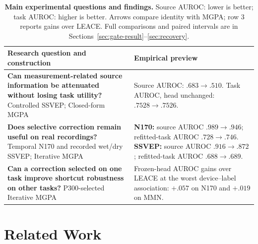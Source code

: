 \documentclass{article}
\theoremstyle{plain}
\theoremstyle{definition}
\begin{document}
\begin{table}[htbp]
\centering\small
\caption{\textbf{Main experimental questions and findings.}
Source AUROC: lower is better;
task AUROC: higher is better. Arrows compare identity with MGPA;
row 3 reports gains over LEACE. Full comparisons and paired intervals are in
Sections~\ref{sec:gate-result}--\ref{sec:recovery}.}
\label{tab:results-glance}
\begin{tabular}{@{}>{\raggedright\arraybackslash}p{}>{\raggedright\arraybackslash}p{}@{}}
\toprule
Research question and construction & Empirical preview \\
\midrule
\textbf{Can measurement-related source information be attenuated without losing task utility?}\newline
Controlled SSVEP; Closed-form MGPA &
Source AUROC: $.683\to .510$.\newline
Task AUROC, head unchanged: $.7528\to .7526$. \\
\addlinespace
\textbf{Does selective correction remain useful on real recordings?}\newline
Temporal N170 and recorded wet/dry SSVEP; Iterative MGPA &
\textbf{N170:} source AUROC $.989\to .946$;\newline
refitted-task AUROC $.728\to .746$.\newline
\textbf{SSVEP:} source AUROC $.916\to .872$;\newline
refitted-task AUROC $.688\to .689$. \\
\addlinespace
\textbf{Can a correction selected on one task improve shortcut robustness on other tasks?}\newline
P300-selected Iterative MGPA &
Frozen-head AUROC gains over LEACE at the worst device--label association:\newline
$+.057$ on N170 and $+.019$ on MMN. \\
\bottomrule
\end{tabular}
\end{table}

\section{Related Work}
\label{sec:related}
\end{document}
